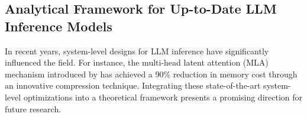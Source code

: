 \subsection{Analytical Framework for Up-to-Date LLM Inference Models}
In recent years, system-level designs for LLM inference have significantly influenced the field. For instance, the multi-head latent attention (MLA) mechanism introduced by \cite{deepseekai2024deepseekv2strongeconomicalefficient} has achieved a 90\% reduction in memory cost through an innovative compression technique. Integrating these state-of-the-art system-level optimizations into a theoretical framework presents a promising direction for future research.
